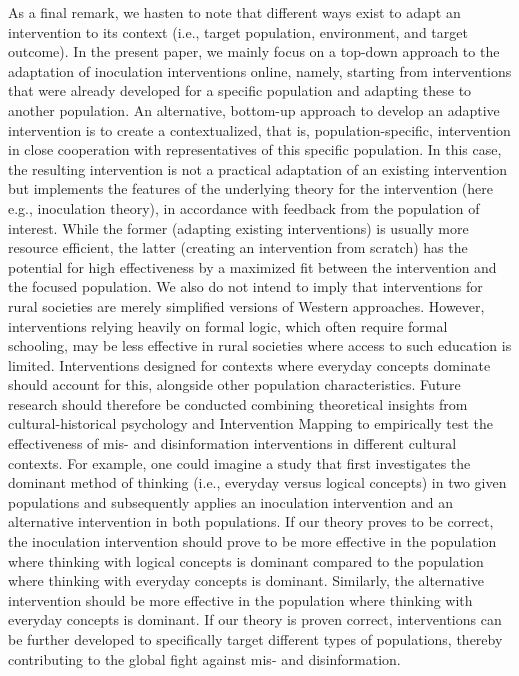 \documentclass[authordate, reflection]{jote-new-article}
\begin{document}
	As a final remark, we hasten to note that different ways exist to adapt an intervention to its context (i.e., target population, environment, and target outcome). In the present paper, we mainly focus on a top-down approach to the adaptation of inoculation interventions online, namely, starting from interventions that were already developed for a specific population and adapting these to another population. An alternative, bottom-up approach to develop an adaptive intervention is to create a contextualized, that is, population-specific, intervention in close cooperation with representatives of this specific population. In this case, the resulting intervention is not a practical adaptation of an existing intervention but implements the features of the underlying theory for the intervention (here e.g., inoculation theory), in accordance with feedback from the population of interest. While the former (adapting existing interventions) is usually more resource efficient, the latter (creating an intervention from scratch) has the potential for high effectiveness by a maximized fit between the intervention and the focused population. We also do not intend to imply that interventions for rural societies are merely simplified versions of Western approaches. However, interventions relying heavily on formal logic, which often require formal schooling, may be less effective in rural societies where access to such education is limited. Interventions designed for contexts where everyday concepts dominate should account for this, alongside other population characteristics. Future research should therefore be conducted combining theoretical insights from cultural-historical psychology and Intervention Mapping to empirically test the effectiveness of mis- and disinformation interventions in different cultural contexts. For example, one could imagine a study that first investigates the dominant method of thinking (i.e., everyday versus logical concepts) in two given populations and subsequently applies an inoculation intervention and an alternative intervention in both populations. If our theory proves to be correct, the inoculation intervention should prove to be more effective in the population where thinking with logical concepts is dominant compared to the population where thinking with everyday concepts is dominant. Similarly, the alternative intervention should be more effective in the population where thinking with everyday concepts is dominant. If our theory is proven correct, interventions can be further developed to specifically target different types of populations, thereby contributing to the global fight against mis- and disinformation.
\end{document}
